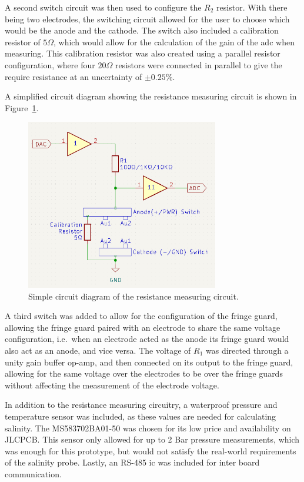 A second switch circuit was then used to configure the $R_2$ resistor.
With there being two electrodes, the switching circuit allowed for the user to choose which would be the anode and the cathode.
The switch also included a calibration resistor of $5\Omega$, which would allow for the calculation of the gain of the \gls{adc} when measuring.
This calibration resistor was also created using a parallel resistor configuration, where four $20\Omega$ resistors were connected in parallel to give the require resistance at an uncertainty of $\pm0.25\%$.

A simplified circuit diagram showing the resistance measuring circuit is shown in Figure~\ref{fig:resistance_circuit}.

\begin{figure}[H]\label{fig:resistance_circuit}
    \centering
    \includegraphics[width=0.75\textwidth]{figures/fig_resistance_circuit.png}
    \caption{Simple circuit diagram of the resistance measuring circuit.}
\end{figure}

A third switch was added to allow for the configuration of the fringe guard, allowing the fringe guard paired with an electrode to share the same voltage configuration, i.e.~when an electrode acted as the anode its fringe guard would also act as an anode, and vice versa.
The voltage of $R_1$ was directed through a unity gain buffer op-amp, and then connected on its output to the fringe guard, allowing for the same voltage over the electrodes to be over the fringe guards without affecting the measurement of the electrode voltage.

In addition to the resistance measuring circuitry, a waterproof pressure and temperature sensor was included, as these values are needed for calculating salinity.
The MS583702BA01-50 was chosen for its low price and availability on JLCPCB.
This sensor only allowed for up to 2 Bar pressure measurements, which was enough for this prototype, but would not satisfy the real-world requirements of the salinity probe.
Lastly, an RS-485 \gls{ic} was included for inter board communication.

